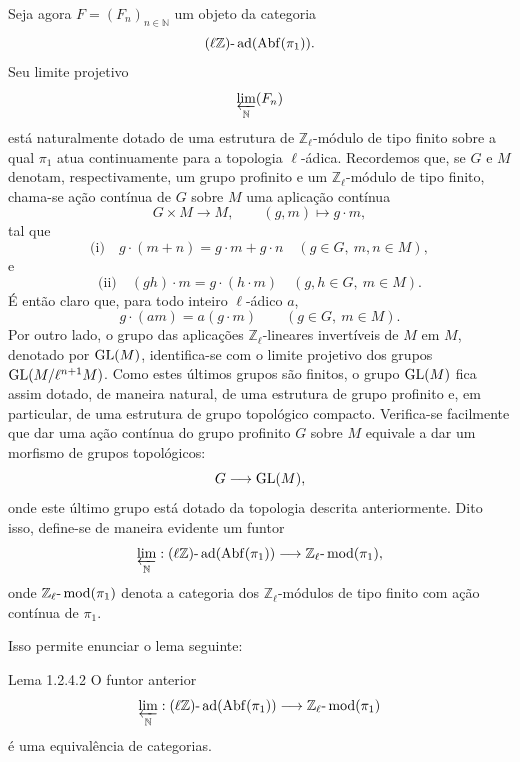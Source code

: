 Seja agora \(F=(F_n)_{n\in\mathbb N}\) um objeto da categoria
\[
(\ell\mathbb Z)\text{-}\operatorname{ad}(\operatorname{Abf}(\pi_1)).
\]
Seu limite projetivo
\[
\varprojlim_{\mathbb N}(F_n)
\]
está naturalmente dotado de uma estrutura de \(\mathbb Z_\ell\)-módulo de tipo finito sobre a qual \(\pi_1\) atua continuamente para a topologia \(\ell\)-ádica. Recordemos que, se \(G\) e \(M\) denotam, respectivamente, um grupo profinito e um \(\mathbb Z_\ell\)-módulo de tipo finito, chama-se ação contínua de \(G\) sobre \(M\) uma aplicação contínua
\[
G\times M\longrightarrow M,\qquad (g,m)\longmapsto g\cdot m,
\]
tal que
\[
\text{(i)}\quad g\cdot(m+n)=g\cdot m+g\cdot n\quad (g\in G,\ m,n\in M),
\]
e
\[
\text{(ii)}\quad (gh)\cdot m=g\cdot(h\cdot m)\quad (g,h\in G,\ m\in M).
\]
É então claro que, para todo inteiro \(\ell\)-ádico \(a\),
\[
g\cdot(am)=a(g\cdot m)\qquad (g\in G,\ m\in M).
\]
Por outro lado, o grupo das aplicações \(\mathbb Z_\ell\)-lineares invertíveis de \(M\) em \(M\), denotado por \(\operatorname{GL}(M)\), identifica-se com o limite projetivo dos grupos \(\operatorname{GL}(M/\ell^{n+1}M)\). Como estes últimos grupos são finitos, o grupo \(\operatorname{GL}(M)\) fica assim dotado, de maneira natural, de uma estrutura de grupo profinito e, em particular, de uma estrutura de grupo topológico compacto. Verifica-se facilmente que dar uma ação contínua do grupo profinito \(G\) sobre \(M\) equivale a dar um morfismo de grupos topológicos:
\[
G\longrightarrow \operatorname{GL}(M),
\]
onde este último grupo está dotado da topologia descrita anteriormente. Dito isso, define-se de maneira evidente um funtor
\[
\varprojlim_{\mathbb N}:(\ell\mathbb Z)\text{-}\operatorname{ad}(\operatorname{Abf}(\pi_1))\longrightarrow
\mathbb Z_\ell\text{-}\operatorname{mod}(\pi_1),
\]
onde \(\mathbb Z_\ell\text{-}\operatorname{mod}(\pi_1)\) denota a categoria dos \(\mathbb Z_\ell\)-módulos de tipo finito com ação contínua de \(\pi_1\).

Isso permite enunciar o lema seguinte:

\begin{statement}{Lema 1.2.4.2}
O funtor anterior
\[
\varprojlim_{\mathbb N}:(\ell\mathbb Z)\text{-}\operatorname{ad}(\operatorname{Abf}(\pi_1))
\longrightarrow \mathbb Z_\ell\text{-}\operatorname{mod}(\pi_1)
\]
é uma equivalência de categorias.
\end{statement}

